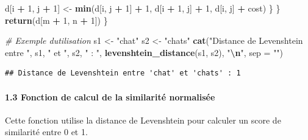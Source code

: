 \documentclass[
]{article}
\newenvironment{Shaded}{\begin{snugshade}}{\end{snugshade}}
\newcommand{\AttributeTok}[1]{\textcolor[rgb]{0.13,0.29,0.53}{#1}}
\newcommand{\CommentTok}[1]{\textcolor[rgb]{0.56,0.35,0.01}{\textit{#1}}}
\newcommand{\DecValTok}[1]{\textcolor[rgb]{0.00,0.00,0.81}{#1}}
\newcommand{\FunctionTok}[1]{\textcolor[rgb]{0.13,0.29,0.53}{\textbf{#1}}}
\newcommand{\NormalTok}[1]{#1}
\newcommand{\OtherTok}[1]{\textcolor[rgb]{0.56,0.35,0.01}{#1}}
\newcommand{\SpecialCharTok}[1]{\textcolor[rgb]{0.81,0.36,0.00}{\textbf{#1}}}
\newcommand{\StringTok}[1]{\textcolor[rgb]{0.31,0.60,0.02}{#1}}
\begin{document}
\begin{Shaded}
\begin{Highlighting}[]
\NormalTok{      d[i }\SpecialCharTok{+} \DecValTok{1}\NormalTok{, j }\SpecialCharTok{+} \DecValTok{1}\NormalTok{] }\OtherTok{\textless{}{-}} \FunctionTok{min}\NormalTok{(d[i, j }\SpecialCharTok{+} \DecValTok{1}\NormalTok{] }\SpecialCharTok{+} \DecValTok{1}\NormalTok{,}
\NormalTok{                             d[i }\SpecialCharTok{+} \DecValTok{1}\NormalTok{, j] }\SpecialCharTok{+} \DecValTok{1}\NormalTok{,}
\NormalTok{                             d[i, j] }\SpecialCharTok{+}\NormalTok{ cost)}
\NormalTok{    \}}
\NormalTok{  \}}
  \FunctionTok{return}\NormalTok{(d[m }\SpecialCharTok{+} \DecValTok{1}\NormalTok{, n }\SpecialCharTok{+} \DecValTok{1}\NormalTok{])}
\NormalTok{\}}

\CommentTok{\# Exemple d\textquotesingle{}utilisation}
\NormalTok{s1 }\OtherTok{\textless{}{-}} \StringTok{"chat"}
\NormalTok{s2 }\OtherTok{\textless{}{-}} \StringTok{"chats"}
\FunctionTok{cat}\NormalTok{(}\StringTok{"Distance de Levenshtein entre \textquotesingle{}"}\NormalTok{, s1, }\StringTok{"\textquotesingle{} et \textquotesingle{}"}\NormalTok{, s2, }\StringTok{"\textquotesingle{} : "}\NormalTok{, }
    \FunctionTok{levenshtein\_distance}\NormalTok{(s1, s2), }\StringTok{"}\SpecialCharTok{\textbackslash{}n}\StringTok{"}\NormalTok{, }\AttributeTok{sep =} \StringTok{""}\NormalTok{)}
\end{Highlighting}
\end{Shaded}

\begin{verbatim}
## Distance de Levenshtein entre 'chat' et 'chats' : 1
\end{verbatim}

\hypertarget{fonction-de-calcul-de-la-similarituxe9-normalisuxe9e}{%
\paragraph{1.3 Fonction de calcul de la similarité
normalisée}\label{fonction-de-calcul-de-la-similarituxe9-normalisuxe9e}}

Cette fonction utilise la distance de Levenshtein pour calculer un score
de similarité entre 0 et 1.
\end{document}
